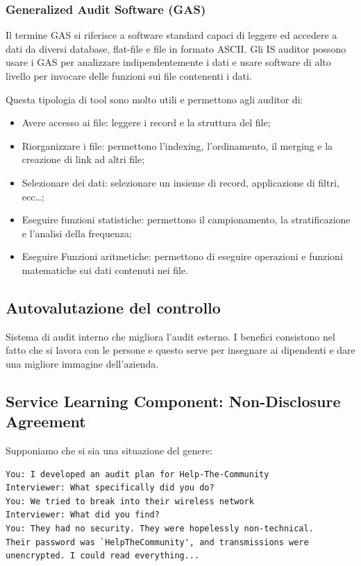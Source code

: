 \subsubsection{Generalized Audit Software (GAS)}
Il termine GAS si riferisce a software standard capaci di leggere
ed accedere a dati da diversi database, flat-file e file in formato
ASCII. Gli IS auditor possono usare i GAS per analizzare indipendentemente
i dati e usare software di alto livello per invocare delle funzioni
sui file contenenti i dati.

Questa tipologia di tool sono molto utili e permettono agli auditor di:
\begin{itemize}
\item Avere accesso ai file: leggere i record e la struttura del file;
\item Riorganizzare i file: permettono l'indexing, l'ordinamento,
il merging e la creazione di link ad altri file;
\item Selezionare dei dati: selezionare un insieme di record,
applicazione di filtri, ecc\dots;
\item Eseguire funzioni statistiche: permettono il campionamento, 
la stratificazione e l'analisi della frequenza;
\item Eseguire Funzioni aritmetiche: permettono di eseguire operazioni e 
funzioni matematiche sui dati contenuti nei file.
\end{itemize}



\subsection{Autovalutazione del controllo}

Sistema di audit interno che migliora l'audit esterno. I benefici consistono
nel fatto che si lavora con le persone e questo serve per insegnare ai
dipendenti e dare una migliore immagine dell'azienda.


\subsection{Service Learning Component: Non-Disclosure Agreement}

Supponiamo che si sia una situazione del genere:

\begin{verbatim}
You: I developed an audit plan for Help-The-Community
Interviewer: What specifically did you do?
You: We tried to break into their wireless network
Interviewer: What did you find?
You: They had no security. They were hopelessly non-technical.
Their password was `HelpTheCommunity', and transmissions were
unencrypted. I could read everything...
\end{verbatim}

